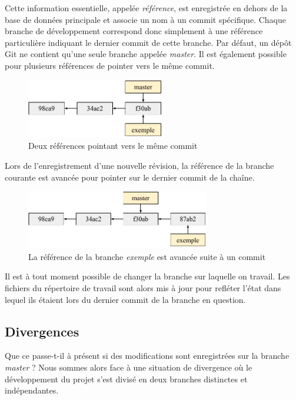 \documentclass[11pt,a4paper]{article}
\begin{document}
Cette information essentielle, appelée \textit{référence}, est enregistrée en dehors de la base de données principale et associe un nom à un commit spécifique. Chaque branche de développement correspond donc simplement à une référence particulière indiquant le dernier commit de cette branche. Par défaut, un dépôt Git ne contient qu'une seule branche appelée \textit{master}. Il est également possible pour plusieurs références de pointer vers le même commit.

\begin{figure}[h]
\begin{center}
\includegraphics[width=6cm]{img_refs}
\caption{Deux références pointant vers le même commit}
\end{center}
\end{figure}

Lors de l'enregistrement d'une nouvelle révision, la référence de la branche courante est avancée pour pointer sur le dernier commit de la chaîne.

\begin{figure}[h]
\begin{center}
\includegraphics[width=8cm]{img_refs2}
\caption{La référence de la branche \textit{exemple} est avancée suite à un commit}
\end{center}
\end{figure}

Il est à tout moment possible de changer la branche sur laquelle on travail. Les fichiers du répertoire de travail sont alors mis à jour pour refléter l'état dans lequel ils étaient lors du dernier commit de la branche en question.

\subsection{Divergences}

Que ce passe-t-il à présent si des modifications sont enregistrées sur la branche \textit{master} ? Nous sommes alors face à une situation de divergence où le développement du projet s'est divisé en deux branches distinctes et indépendantes.
\end{document}
